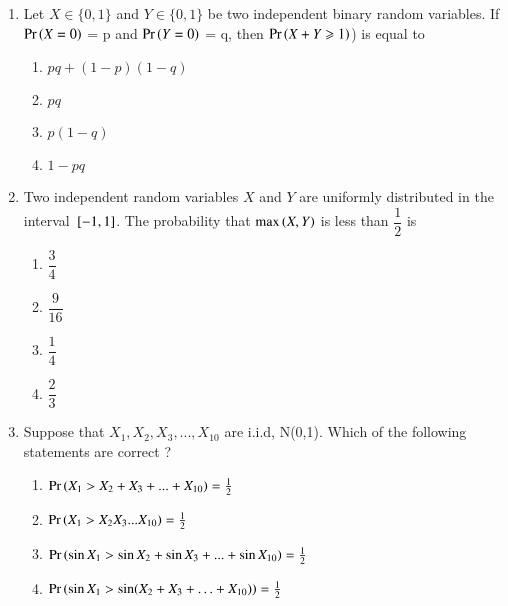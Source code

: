 \renewcommand{\theequation}{\theenumi}
\renewcommand{\thefigure}{\theenumi}
\renewcommand{\thetable}{\theenumi}
\begin{enumerate}[label=\thesection.\arabic*.,ref=\thesection.\theenumi]


\item Let  $X\in \{ 0,1 \}$ and $Y\in \{ 0,1 \}$ be two independent binary random variables. If $\Pr\left(X=0\right)$ = p and  $\Pr\left(Y=0\right)$ = q, then $\Pr\left(X+Y \geqslant 1\right)$) is equal to 
\begin{enumerate}
\item $pq+(1-p)(1-q)$ 
\item  $pq$    
\item $p(1-q)$ 
\item  $1-pq$  
\end{enumerate}
%
\solution
%
%
%
\item Two independent random variables $X$ and $Y$ are uniformly distributed in the interval ${}\left[-1,1\right]$. The probability that $\max \left(X,Y\right)$ is less than $\dfrac{1}{2}$ is 
\begin{multicols}{4}
\begin{enumerate}
\item $\dfrac{3}{4}$
\item $\dfrac{9}{16}$
\item $\dfrac{1}{4}$
\item $\dfrac{2}{3}$
\end{enumerate}
\end{multicols}
\solution
%
%
%
\item Suppose that $X_1,X_2,X_3,...,X_{10}$ are i.i.d, N(0,1). Which of the following statements are correct ?
\begin{enumerate}[label = (\Alph*)]
    \item $\Pr\left(X_1>X_2+X_3+...+X_{10}\right)=\frac{1}{2}$
    \item $\Pr\left(X_1>X_2X_3...X_{10}\right)=\frac{1}{2}$
    \item $\Pr\left(\sin{X_1}>\sin{X_2}+\sin{X_3}+...+\sin{X_{10}}\right)=\frac{1}{2}$
    \item $\Pr\left(\sin{X_1}>\sin({X_2+X_3+\ldots+X_{10}})\right)=\frac{1}{2}$
\end{enumerate}
\solution
%



\end{enumerate}
